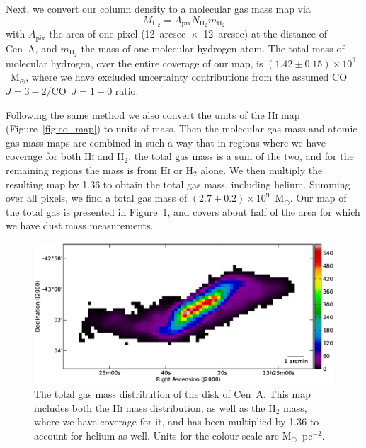 \documentclass[useAMS,usenatbib,usegraphicx]{mn2e}
\begin{document}
Next, we convert our column density to a molecular gas mass map via
\begin{equation}\label{eqn:mol_gas_mass}
M_{\mathrm{H}_{2}} = A_{\mathrm{pix}} N_{\mathrm{H}_{2}} m_{\mathrm{H}_{2}}
\end{equation}
with $A_{\mathrm{pix}}$ the area of one pixel (12~arcsec~$\times$~12~arcsec) at the distance of Cen~A, and $m_{\mathrm{H}_{2}}$ the mass of one molecular hydrogen atom.  The total mass of molecular hydrogen, over the entire coverage of our map, is $(1.42 \pm 0.15) \times 10^{9}$~M$_{\odot}$, where we have excluded uncertainty contributions from the assumed CO~$J=3-2$/CO~$J=1-0$ ratio.

Following the same method we also convert the units of the H\textsc{i} map (Figure~\ref{fig:co_map}) to units of mass.  Then the molecular gas mass and atomic gas mass maps are combined in such a way that in regions where we have coverage for both H\textsc{i} and H$_{2}$, the total gas mass is a sum of the two, and for the remaining regions the mass is from H\textsc{i} or H$_{2}$ alone.  We then multiply the resulting map by 1.36 to obtain the total gas mass, including helium.  Summing over all pixels, we find a total gas mass of $(2.7 \pm 0.2)\times 10^{9}$~M$_{\odot}$.  Our map of the total gas is presented in Figure~\ref{fig:gas}, and covers about half of the area for which we have dust mass measurements.

\begin{figure}
\includegraphics[width=15cm]{Fig6_CenA_tot_gas_mass}
\caption{The total gas mass distribution of the disk of Cen~A.  This map includes both the H\textsc{i} mass distribution, as well as the H$_{2}$ mass, where we have coverage for it, and has been multiplied by 1.36 to account for helium as well.  Units for the colour scale are M$_{\odot}$~pc$^{-2}$.}
\label{fig:gas}
\end{figure}
\end{document}
